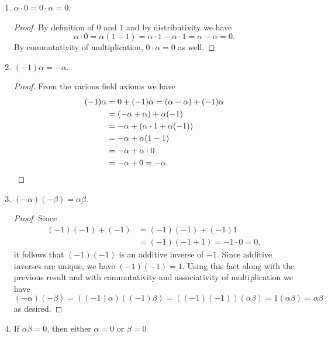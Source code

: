 \begin{enumerate}
\begin{proof}
\begin{equation*}
      = (\alpha - \alpha) + \beta
      = 0 + \beta
      = \beta. \qedhere
    \end{equation*}
  \end{proof}
\item $\alpha\cdot0 = 0\cdot\alpha = 0$.
  \begin{proof}
    By definition of $0$ and $1$ and by distributivity we have
    \begin{equation*}
      \alpha\cdot0 = \alpha(1 - 1)
      = \alpha\cdot1 - \alpha\cdot1
      = \alpha - \alpha = 0.
    \end{equation*}
    By commutativity of multiplication, $0\cdot\alpha = 0$ as well.
  \end{proof}
\item $(-1)\alpha = -\alpha$.
  \begin{proof}
    From the various field axioms we have
    \begin{align*}
      (-1)\alpha
      &= 0 + (-1)\alpha
        = (\alpha - \alpha) + (-1)\alpha \\
      &= (-\alpha + \alpha) + \alpha(-1) \\
      &= -\alpha + (\alpha\cdot1 + \alpha(-1)) \\
      &= -\alpha + \alpha(1 - 1) \\
      &= -\alpha + \alpha\cdot0 \\
      &= -\alpha + 0
        = -\alpha. \qedhere
    \end{align*}
  \end{proof}
\item $(-\alpha)(-\beta) = \alpha\beta$.
  \begin{proof}
    Since
    \begin{align*}
      (-1)(-1) + (-1) &= (-1)(-1) + (-1)1 \\
                      &= (-1)(-1 + 1) = -1\cdot0 = 0,
    \end{align*}
    it follows that $(-1)(-1)$ is an additive inverse of $-1$. Since
    additive inverses are unique, we have $(-1)(-1) = 1$. Using this
    fact along with the previous result and with commutativity and
    associativity of multiplication we have
    \begin{equation*}
      (-\alpha)(-\beta)
      = ((-1)\alpha)((-1)\beta)
      = ((-1)(-1))(\alpha\beta)
      = 1(\alpha\beta) = \alpha\beta
    \end{equation*}
    as desired.
  \end{proof}
\item If $\alpha\beta = 0$, then either $\alpha = 0$ or $\beta = 0$

\end{enumerate}
